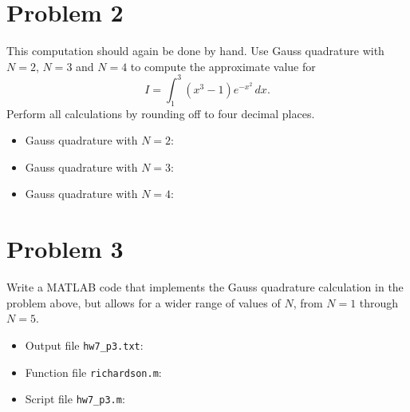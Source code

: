 \section{Problem 2}%
\label{sec:problem_2}
This computation should again be done by hand. Use Gauss quadrature with $N = 2$, $N = 3$ and $N = 4$ to compute the approximate value for
\begin{equation*}
  I = \int_{1}^{3} (x^{3} - 1) e^{-x^{2}} \, dx.
\end{equation*}
Perform all calculations by rounding off to four decimal places.
\begin{solution}
  \quad
  \begin{itemize}
    \item Gauss quadrature with $N = 2$:
    \item Gauss quadrature with $N = 3$:
    \item Gauss quadrature with $N = 4$:
      \vfill                                      %
  \end{itemize}
\end{solution}


\section{Problem 3}%
\label{sec:problem_3}
Write a MATLAB code that implements the Gauss quadrature calculation in the problem above, but allows for a wider range of values of $N$, from $N = 1$ through $N = 5$.
\begin{solution}
  \quad
  \begin{itemize}
  \item Output file \verb|hw7_p3.txt|:
    
  \item Function file \verb|richardson.m|:
    
  \item Script file \verb|hw7_p3.m|:
    
  \end{itemize}
\end{solution}

